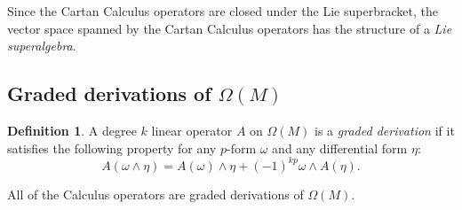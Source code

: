 \documentclass[12pt]{article}
\theoremstyle{definition}
\newtheorem{dfn}[thm]{Definition}
\theoremstyle{remark}
\begin{document}
Since the Cartan Calculus operators are closed under the Lie superbracket, the vector space spanned by the Cartan Calculus operators has the structure of a \emph{Lie superalgebra}.

\subsection*{Graded derivations of $\Omega(M)$}
\begin{dfn}
A degree $k$ linear operator $A$ on $\Omega(M)$ is a \emph{graded derivation} if it satisfies the following property for any $p$-form $\omega$ and any differential form $\eta$:
\begin{equation}
A (\omega \wedge \eta) = A(\omega) \wedge \eta + (-1)^{kp} \omega \wedge A(\eta).
\end{equation}
\end{dfn}

All of the Calculus operators are graded derivations of $\Omega(M)$.

\end{document}
